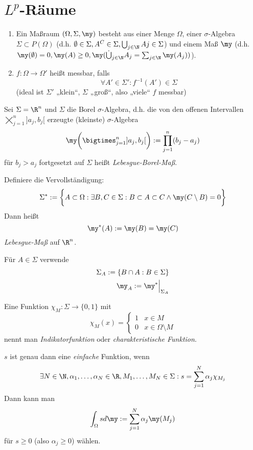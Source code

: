 \documentclass{mycourse}
\begin{document}
\chapter{\texorpdfstring{$L^p$}{Lp}-Räume}


\begin{df} \label{2.1}
	\begin{enumerate}[1)]
		\item
			Ein Maßraum $(\Omega, \Sigma, \my)$ besteht aus einer Menge $\Omega$, einer $\sigma$-Algebra $\Sigma \subset P(\Omega)$ (d.h. $\emptyset \in \Sigma, A^C \in \Sigma, \bigcup_{j\in \N} Aj \in \Sigma$) und einem Maß $\my$ (d.h. $\my(\emptyset) = 0, \my(A) \ge 0, \my(\dot\bigcup_{j\in \N}A_j = \sum_{j\in \N} \my(A_j))$).
		\item
			$f: \Omega \to \Omega'$ heißt messbar, falls
			\[
				\forall A' \in \Sigma' : f^{-1}(A') \in \Sigma
			\]
			(ideal ist $\Sigma'$ „klein“, $\Sigma$ „groß“, also „viele“ $f$ messbar)
	\end{enumerate}
\end{df}

\begin{ex}[Anwendung]
	Sei $\Sigma = \R^n$ und $\Sigma$ die Borel $\sigma$-Algebra, d.h. die von den offenen Intervallen $\bigtimes_{j=1}^n ]a_j,b_j[$ erzeugte (kleinste) $\sigma$-Algebra
	\[
		\my \bigg( \bigtimes_{j=1}^n ]a_j,b_j[ \bigg) := \prod_{j=1}^n (b_j - a_j)
	\]
	für $b_j > a_j$ fortgesetzt auf $\Sigma$ heißt \emph{Lebesgue-Borel-Maß}.

	Definiere die Vervollständigung:
	\[
		\Sigma^* := \bigg\{ A \subset \Omega : \exists B,C \in \Sigma : B \subset A \subset C \land \my(C \setminus B) = 0 \bigg\}
	\]
	Dann heißt
	\[
		\my^*(A) := \my(B) = \my(C)
	\]
	\emph{Lebesgue-Maß} auf $\R^n$.

	Für $A \in \Sigma$ verwende
	\begin{align*}
		\Sigma_A := \{ B \cap A : B \in \Sigma \} \\
		\my_A := \my^* \Big|_{\Sigma_A}
	\end{align*}
\end{ex}

\begin{df*}
	Eine Funktion $\chi_M: \Sigma \to \{0,1\}$ mit
	\[
		\chi_M (x) = \begin{cases}
			1 & x\in M \\
			0 & x \in \Omega \setminus M
		\end{cases}
	\]
	nennt man \emph{Indikatorfunktion} oder \emph{charakteristische Funktion}.

	$s$ ist genau dann eine \emph{einfache} Funktion, wenn
	\[
		\exists N \in \N, \alpha_1, \dotsc, \alpha_N \in \R, M_1, \dotsc, M_N \in \Sigma : s = \sum_{j=1}^N \alpha_j \chi_{M_j}
	\]
	Dann kann man
	\[
		\int_{\Omega} s d\my := \sum_{j=1}^N \alpha_j \my(M_j)
	\]
	für $s \ge 0$ (also  $\alpha_j \ge 0$) wählen.
\end{df*}
\end{document}
